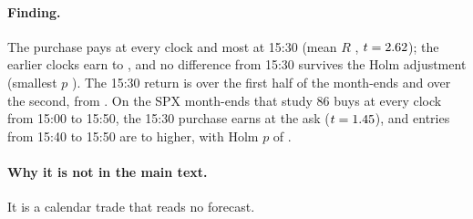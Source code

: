 \paragraph{Finding.} The purchase pays at every clock and most at 15:30 (mean
$R$ \runappMeR{}, $t=2.62{}$); the earlier clocks earn \runappMeEarlyLo{}
to \runappMeEarlyHi{}, and no difference from 15:30 survives the Holm
adjustment (smallest $p$ \runappMeHolmMin{}). The 15:30 return is
\runappMeFirstHalf{} over the first half of the month-ends and
\runappMeSecondHalf{} over the second, from \runappMeSplit{}. On the
\runappDsMonthEnds{} SPX month-ends that study 86 buys at every clock from
15:00 to 15:50, the 15:30 purchase earns \runappDsMeLast{} at the ask
($t=1.45{}$), and entries from 15:40 to 15:50 are
\runappDsMeLaterLo{} to \runappDsMeLaterHi{} higher, with Holm $p$ of
\runappDsMeHolmMin{}.

\paragraph{Why it is not in the main text.} It is a calendar trade that reads
no forecast.

